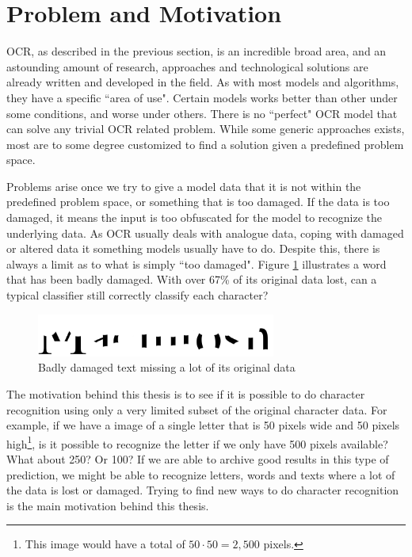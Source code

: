 
\section{Problem and Motivation}
OCR, as described in the previous section, is an incredible broad area, and an astounding amount of research, approaches and technological solutions are already written and developed in the field. As with most models and algorithms, they have a specific ``area of use". Certain models works better than other under some conditions, and worse under others. There is no ``perfect" OCR model that can solve any trivial OCR related problem. While some generic approaches exists, most are to some degree customized to find a solution given a predefined problem space.

Problems arise once we try to give a model data that it is not within the predefined problem space, or something that is too damaged. If the data is too damaged, it means the input is too obfuscated for the model to recognize the underlying data. As OCR usually deals with analogue data, coping with damaged or altered data it something models usually have to do. Despite this, there is always a limit as to what is simply ``too damaged". Figure \ref{fig:damaged-text} illustrates a word that has been badly damaged. With over 67\% of its original data lost, can a typical classifier still correctly classify each character?

\begin{figure}[ht]
    \centering
    \includegraphics[width=0.7\textwidth]{fig/chapter1/damaged.png}
    \caption{Badly damaged text missing a lot of its original data}
    \label{fig:damaged-text}
\end{figure}

The motivation behind this thesis is to see if it is possible to do character recognition using only a very limited subset of the original character data. For example, if we have a image of a single letter that is 50 pixels wide and 50 pixels high\footnote{This image would have a total of $50 \cdot 50 = 2,500$ pixels.}, is it possible to recognize the letter if we only have 500 pixels available? What about 250? Or 100? If we are able to archive good results in this type of prediction, we might be able to recognize letters, words and texts where a lot of the data is lost or damaged. Trying to find new ways to do character recognition is the main motivation behind this thesis.

